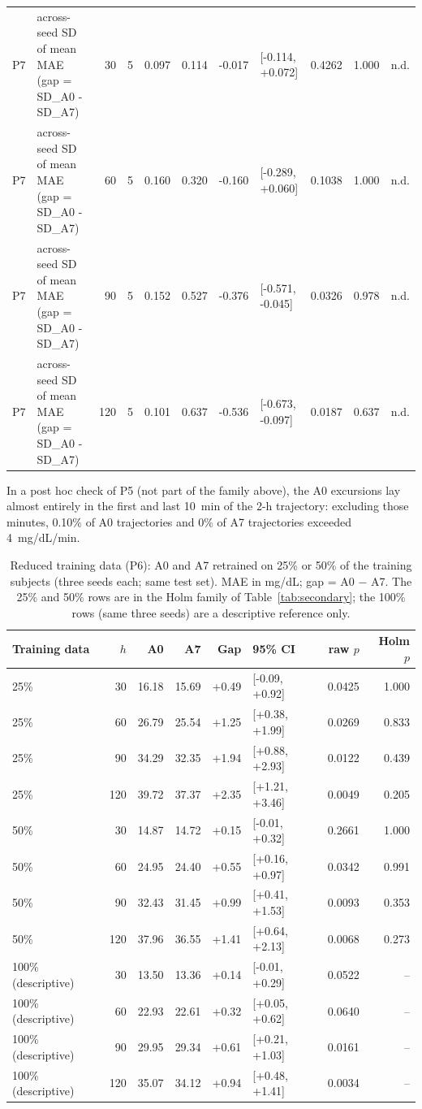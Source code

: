 \documentclass[10pt]{article}
\begin{document}
{\begin{longtable}{l>{\raggedright\arraybackslash}p{3.6cm}rrrrrlrrl}
P7 & across-seed SD of mean MAE (gap = SD\_A0 - SD\_A7) & 30 & 5 & 0.097 & 0.114 & -0.017 & [-0.114, +0.072] & 0.4262 & 1.000 & n.d. \\
P7 & across-seed SD of mean MAE (gap = SD\_A0 - SD\_A7) & 60 & 5 & 0.160 & 0.320 & -0.160 & [-0.289, +0.060] & 0.1038 & 1.000 & n.d. \\
P7 & across-seed SD of mean MAE (gap = SD\_A0 - SD\_A7) & 90 & 5 & 0.152 & 0.527 & -0.376 & [-0.571, -0.045] & 0.0326 & 0.978 & n.d. \\
P7 & across-seed SD of mean MAE (gap = SD\_A0 - SD\_A7) & 120 & 5 & 0.101 & 0.637 & -0.536 & [-0.673, -0.097] & 0.0187 & 0.637 & n.d. \\
\bottomrule
\end{longtable}
}

In a post hoc check of P5 (not part of the family above), the A0 excursions lay almost entirely in the first and last 10~min of the 2-h trajectory: excluding those minutes, 0.10\% of A0 trajectories and 0\% of A7 trajectories exceeded 4~mg/dL/min.

\begin{table}[h!]
\centering
\caption{Reduced training data (P6): A0 and A7 retrained on 25\% or 50\% of the training subjects (three seeds each; same test set). MAE in mg/dL; gap = A0 $-$ A7. The 25\% and 50\% rows are in the Holm family of Table~\ref{tab:secondary}; the 100\% rows (same three seeds) are a descriptive reference only.}
\label{tab:lowdata}
\footnotesize
\begin{tabular}{lrrrrlrr}
\toprule
Training data & $h$ & A0 & A7 & Gap & 95\% CI & raw $p$ & Holm $p$ \\
\midrule
25\% & 30 & 16.18 & 15.69 & +0.49 & [-0.09, +0.92] & 0.0425 & 1.000 \\
25\% & 60 & 26.79 & 25.54 & +1.25 & [+0.38, +1.99] & 0.0269 & 0.833 \\
25\% & 90 & 34.29 & 32.35 & +1.94 & [+0.88, +2.93] & 0.0122 & 0.439 \\
25\% & 120 & 39.72 & 37.37 & +2.35 & [+1.21, +3.46] & 0.0049 & 0.205 \\
50\% & 30 & 14.87 & 14.72 & +0.15 & [-0.01, +0.32] & 0.2661 & 1.000 \\
50\% & 60 & 24.95 & 24.40 & +0.55 & [+0.16, +0.97] & 0.0342 & 0.991 \\
50\% & 90 & 32.43 & 31.45 & +0.99 & [+0.41, +1.53] & 0.0093 & 0.353 \\
50\% & 120 & 37.96 & 36.55 & +1.41 & [+0.64, +2.13] & 0.0068 & 0.273 \\
100\% (descriptive) & 30 & 13.50 & 13.36 & +0.14 & [-0.01, +0.29] & 0.0522 & -- \\
100\% (descriptive) & 60 & 22.93 & 22.61 & +0.32 & [+0.05, +0.62] & 0.0640 & -- \\
100\% (descriptive) & 90 & 29.95 & 29.34 & +0.61 & [+0.21, +1.03] & 0.0161 & -- \\
100\% (descriptive) & 120 & 35.07 & 34.12 & +0.94 & [+0.48, +1.41] & 0.0034 & -- \\
\bottomrule
\end{tabular}
\end{table}
\end{document}
